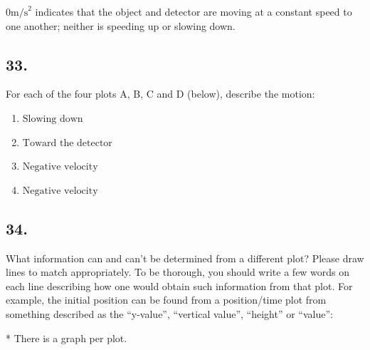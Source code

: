     \begin{mdframed}
        $0\text{m/s}^2$ indicates that the object and detector are moving at a constant speed to one another; neither is speeding up or slowing down.
    \end{mdframed}

    \subsection*{33.}
    For each of the four plots A, B, C and D (below), describe the motion:

    \begin{enumerate}[label=\alph*.]
        \item $\boxed{\text{Slowing down}}$
        \item $\boxed{\text{Toward the detector}}$
        \item $\boxed{\text{Negative velocity}}$
        \item $\boxed{\text{Negative velocity}}$
    \end{enumerate}
    
    \subsection*{34.} 
    What information can and can't be determined from a different plot? Please draw lines to match appropriately. To be thorough, you should write a few words on each line describing how one would obtain such information from that plot. For example, the initial position can be found from a position/time plot from something described as the “y-value”, “vertical value”, “height” or “value”:

    * There is a graph per plot.

